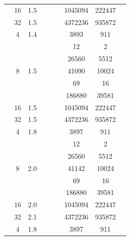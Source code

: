 \begin{table}[htbp]
\begin{tabular}{l S[table-format=3.0] S[table-format=4.1] l S[table-format=6.0] S[table-format=6.0] S[table-format=6.0] S[table-format=5.0] S[table-format=2.0]}
     & 16 & 1.5 &  & {\text{---}} & {\text{---}} & 1045094 & 222447 & {\text{---}} \\
     & 32 & 1.5 &  & {\text{---}} & {\text{---}} & 4372236 & 935872 & {\text{---}} \\
    \midrule
     & 4 & 1.4 &  & {\text{---}} & {\text{---}} & 3893 & 911 & {\text{---}} \\
     &  &  &  & {\text{---}} & {\text{---}} & 12 & 2 & {\text{---}} \\
     &  &  &  & {\text{---}} & {\text{---}} & 26560 & 5512 & {\text{---}} \\
     & 8 & 1.5 &  & {\text{---}} & {\text{---}} & 41090 & 10024 & {\text{---}} \\
     &  &  &  & {\text{---}} & {\text{---}} & 69 & 16 & {\text{---}} \\
     &  &  &  & {\text{---}} & {\text{---}} & 186880 & 39581 & {\text{---}} \\
     & 16 & 1.5 &  & {\text{---}} & {\text{---}} & 1045094 & 222447 & {\text{---}} \\
     & 32 & 1.5 &  & {\text{---}} & {\text{---}} & 4372236 & 935872 & {\text{---}} \\
    \midrule
     & 4 & 1.8 &  & {\text{---}} & {\text{---}} & 3897 & 911 & {\text{---}} \\
     &  &  &  & {\text{---}} & {\text{---}} & 12 & 2 & {\text{---}} \\
     &  &  &  & {\text{---}} & {\text{---}} & 26560 & 5512 & {\text{---}} \\
     & 8 & 2.0 &  & {\text{---}} & {\text{---}} & 41142 & 10024 & {\text{---}} \\
     &  &  &  & {\text{---}} & {\text{---}} & 69 & 16 & {\text{---}} \\
     &  &  &  & {\text{---}} & {\text{---}} & 186880 & 39581 & {\text{---}} \\
     & 16 & 2.0 &  & {\text{---}} & {\text{---}} & 1045094 & 222447 & {\text{---}} \\
     & 32 & 2.1 &  & {\text{---}} & {\text{---}} & 4372236 & 935872 & {\text{---}} \\
    \midrule
     & 4 & 1.8 &  & {\text{---}} & {\text{---}} & 3897 & 911 & {\text{---}} \\

\end{tabular}
\end{table}
